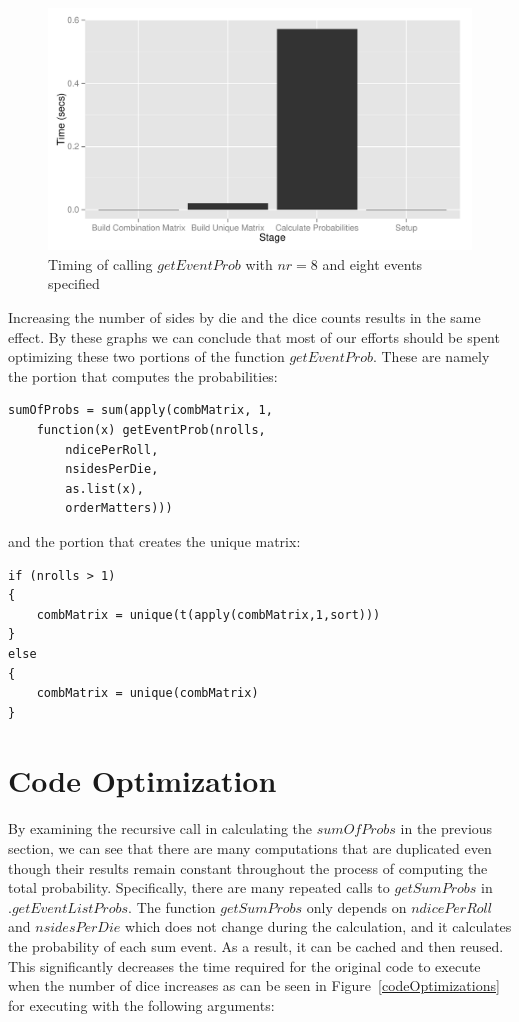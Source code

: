 \documentclass[12pt]{article}
\begin{document}
\begin{figure}[h!]
	\centering
	\includegraphics[width=6in]{getEventProbNr8Events8.pdf}
	\caption{Timing of calling $getEventProb$ with $nr=8$ and eight events specified}
	\label{getEventProbNr8Events8}
\end{figure}

Increasing the number of sides by die and the dice counts results in the same effect. By these graphs we can conclude that most of our efforts should be spent optimizing these two portions of the function $getEventProb$. These are namely the portion that computes the probabilities:

\begin{lstlisting}
sumOfProbs = sum(apply(combMatrix, 1,
	function(x) getEventProb(nrolls,
		ndicePerRoll,
		nsidesPerDie,
		as.list(x),
		orderMatters)))
\end{lstlisting}

and the portion that creates the unique matrix:

\begin{lstlisting}
if (nrolls > 1)
{
	combMatrix = unique(t(apply(combMatrix,1,sort)))
}
else
{
	combMatrix = unique(combMatrix)
}
\end{lstlisting}

\section{Code Optimization}

By examining the recursive call in calculating the $sumOfProbs$ in the previous section, we can see that there are many computations that are duplicated even though their results remain constant throughout the process of computing the total probability. Specifically, there are many repeated calls to $getSumProbs$ in $.getEventListProbs$. The function $getSumProbs$ only depends on $ndicePerRoll$ and $nsidesPerDie$ which does not change during the calculation, and it calculates the probability of each sum event. As a result, it can be cached and then reused. This significantly decreases the time required for the original code to execute when the number of dice increases as can be seen in Figure~\ref{codeOptimizations} for executing with the following arguments:
\end{document}
